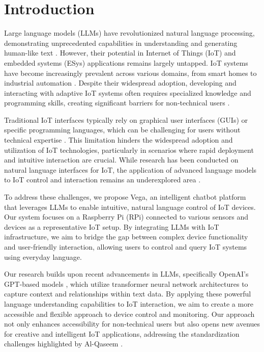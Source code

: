 \documentclass{ieeeaccess}
\begin{document}
\maketitle

\section{Introduction}
\label{sec:introduction}

Large language models (LLMs) have revolutionized natural language processing, demonstrating unprecedented capabilities in understanding and generating human-like text \cite{10.1145/3641289}. However, their potential in Internet of Things (IoT) and embedded systems (ESys) applications remains largely untapped. IoT systems have become increasingly prevalent across various domains, from smart homes to industrial automation \cite{8355897}. Despite their widespread adoption, developing and interacting with adaptive IoT systems often requires specialized knowledge and programming skills, creating significant barriers for non-technical users \cite{10.1145/3447526.3472036}.

Traditional IoT interfaces typically rely on graphical user interfaces (GUIs) or specific programming languages, which can be challenging for users without technical expertise \cite{10.1145/3447526.3472036}. This limitation hinders the widespread adoption and utilization of IoT technologies, particularly in scenarios where rapid deployment and intuitive interaction are crucial. While research has been conducted on natural language interfaces for IoT, the application of advanced language models to IoT control and interaction remains an underexplored area \cite{KASSAB2020102663}.

To address these challenges, we propose Vega, an intelligent chatbot platform that leverages LLMs to enable intuitive, natural language control of IoT devices. Our system focuses on a Raspberry Pi (RPi) connected to various sensors and devices as a representative IoT setup. By integrating LLMs with IoT infrastructure, we aim to bridge the gap between complex device functionality and user-friendly interaction, allowing users to control and query IoT systems using everyday language.

Our research builds upon recent advancements in LLMs, specifically OpenAI's GPT-based models \cite{OpenAI_GPT}, which utilize transformer neural network architectures to capture context and relationships within text data. By applying these powerful language understanding capabilities to IoT interaction, we aim to create a more accessible and flexible approach to device control and monitoring. Our approach not only enhances accessibility for non-technical users but also opens new avenues for creative and intelligent IoT applications, addressing the standardization challenges highlighted by Al-Qaseem \cite{7821686}.
\end{document}
